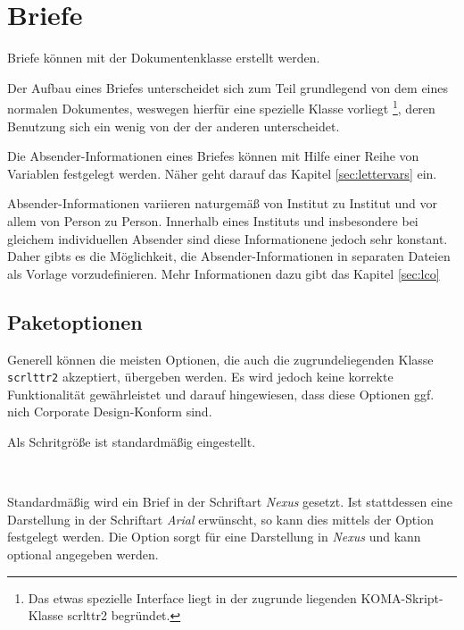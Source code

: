 \chapter{Briefe}

Briefe können mit der Dokumentenklasse  erstellt
werden.

Der Aufbau eines Briefes unterscheidet sich zum Teil grundlegend von dem eines
normalen Dokumentes, weswegen hierfür eine spezielle Klasse vorliegt%
\footnote{Das etwas spezielle Interface liegt in der zugrunde liegenden 
KOMA-Skript-Klasse scrlttr2 begründet.}, deren Benutzung sich ein wenig von
der der anderen unterscheidet.

Die Absender-Informationen eines Briefes können mit Hilfe einer Reihe von
Variablen festgelegt werden. Näher geht darauf das Kapitel \ref{sec:lettervars}
ein.

Absender-Informationen variieren naturgemäß von Institut zu Institut
und vor allem von Person zu Person. Innerhalb eines Instituts und insbesondere
bei gleichem individuellen Absender sind diese Informationene jedoch sehr
konstant. Daher gibts es die Möglichkeit, die Absender-Informationen in
separaten Dateien als Vorlage vorzudefinieren. Mehr Informationen dazu gibt
das Kapitel \ref{sec:lco}

\section{Paketoptionen}

Generell können die meisten Optionen, die auch die zugrundeliegenden Klasse
\texttt{scrlttr2} akzeptiert, übergeben werden. Es wird jedoch keine korrekte
Funktionalität gewährleistet und darauf hingewiesen, dass diese Optionen
ggf. nich Corporate Design-Konform sind.

Als Schritgröße ist standardmäßig \PValue{10pt} eingestellt.

\begin{Declaration}
  \\
\end{Declaration}

Standardmäßig wird ein Brief in der Schriftart \emph{Nexus} gesetzt.
Ist stattdessen eine Darstellung in der Schriftart \emph{Arial} erwünscht,
so kann dies mittels der Option  festgelegt werden.
Die Option  sorgt für eine Darstellung in \emph{Nexus} und
kann optional angegeben werden.

\begin{Declaration}
\end{Declaration}

